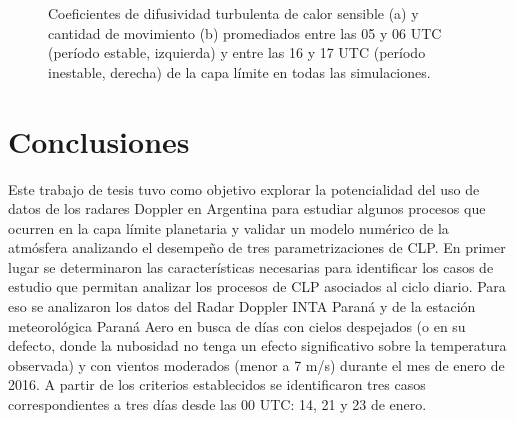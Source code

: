 \documentclass[12pt,spanish,oneside, a4paper]{book}
\begin{document}
\begin{figure}

{\centering {}\newline{}

}

\caption{Coeficientes de difusividad turbulenta de calor sensible (a) y cantidad de movimiento (b) promediados entre las 05 y 06 UTC (período estable, izquierda) y entre las 16 y 17 UTC (período inestable, derecha) de la capa límite en todas las simulaciones.  \label{k-ulke-wrf}}\label{fig:k_ulke_wrf}
\end{figure}

\chapter{Conclusiones}\label{conclusiones}

Este trabajo de tesis tuvo como objetivo explorar la potencialidad del
uso de datos de los radares Doppler en Argentina para estudiar algunos
procesos que ocurren en la capa límite planetaria y validar un modelo
numérico de la atmósfera analizando el desempeño de tres
parametrizaciones de CLP. En primer lugar se determinaron las
características necesarias para identificar los casos de estudio que
permitan analizar los procesos de CLP asociados al ciclo diario. Para
eso se analizaron los datos del Radar Doppler INTA Paraná y de la
estación meteorológica Paraná Aero en busca de días con cielos
despejados (o en su defecto, donde la nubosidad no tenga un efecto
significativo sobre la temperatura observada) y con vientos moderados
(menor a 7 m/s) durante el mes de enero de 2016. A partir de los
criterios establecidos se identificaron tres casos correspondientes a
tres días desde las 00 UTC: 14, 21 y 23 de enero.
\end{document}
